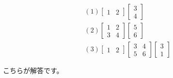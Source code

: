 \[
\begin{aligned}
&\left( 1\right)
\begin{bmatrix}
1 & 2
\end{bmatrix}
\begin{bmatrix}
3 \\
4
\end{bmatrix}\\
&\left( 2\right)
\begin{bmatrix}
1 & 2 \\
3 & 4
\end{bmatrix}\begin{bmatrix}
5 \\
6
\end{bmatrix}\\
&\left( 3\right)
\begin{bmatrix}
1 & 2
\end{bmatrix}\begin{bmatrix}
3 & 4 \\
5 & 6
\end{bmatrix}\begin{bmatrix}
3 \\
1
\end{bmatrix}
\end{aligned}
\]


こちらが解答です。


